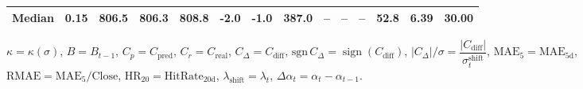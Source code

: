 \begin{threeparttable}
{\begin{tabular}{lrrrrrrrrrrrrr}
 Median &     0.15 & 806.5 &  806.3 & 808.8 &       -2.0 &                     -1.0 &               387.0 &         -- &        -- &             -- &             52.8 &            6.39 &                  30.00 \\
\bottomrule
\end{tabular}
}
\begin{tablenotes}\footnotesize
\item $\kappa=\kappa(\sigma)$, $B=B_{t-1}$, $C_p=C_{\text{pred}}$, $C_r=C_{\text{real}}$, $C_\Delta=C_{\text{diff}}$, $\mathrm{sgn}\,C_\Delta=\operatorname{sign}(C_{\text{diff}})$, $|C_\Delta|/\sigma=\dfrac{|C_{\text{diff}}|}{\sigma_t^{\text{shift}}}$, $\mathrm{MAE}_5=\mathrm{MAE}_{5\text{d}}$, $\mathrm{RMAE}= \mathrm{MAE}_5 / \text{Close}$, $\mathrm{HR}_{20}=\mathrm{HitRate}_{20\text{d}}$, 
$\lambda_{\text{shift}}=\lambda_t$, 
$\Delta\alpha_t=\alpha_t-\alpha_{t-1}$.
\end{tablenotes}
\end{threeparttable}
\endgroup
